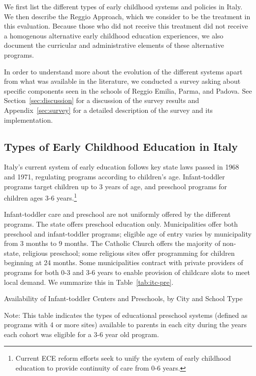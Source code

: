 We first list the different types of early childhood systems and policies in Italy. We then describe the Reggio Approach, which we consider to be the treatment in this evaluation. Because those who did not receive this treatment did not receive a homogenous alternative early childhood education experiences, we also document the curricular and administrative elements of these alternative programs. 

In order to understand more about the evolution of the different systems apart from what was available in the literature, we conducted a survey asking about specific components seen in the schools of Reggio Emilia, Parma, and Padova. See Section~\ref{sec:discussion} for a discussion of the survey results and Appendix~\ref{sec:survey} for a detailed description of the survey and its implementation.

\subsection{Types of Early Childhood Education in Italy}

Italy's current system of early education follows key state laws passed in 1968 and 1971, regulating programs according to children's age. Infant-toddler programs target children up to 3 years of age, and preschool programs for children ages 3-6 years.\footnote{Current ECE reform efforts seek to unify the system of early childhood education to provide continuity of care from 0-6 years.} 

Infant-toddler care and preschool are not uniformly offered by the different programs. The state offers preschool education only. Municipalities offer both preschool and infant-toddler programs; eligible age of entry varies by municipality from 3 months to 9 months. The Catholic Church offers the majority of non-state, religious preschool; some religious sites offer programming for children beginning at 24 months. Some municipalities contract with private providers of programs for both 0-3 and 3-6 years to enable provision of childcare slots to meet local demand. We summarize this in Table~\ref{tab:itc-pre}.

\begin{table}[H]
\centering
\caption{Availability of Infant-toddler Centers and Preschools, by City and School Type}\label{tab:itc-pre}
\begin{adjustbox}{width=\textwidth}
\begin{threeparttable}
	
\begin{tablenotes}
Note: This table indicates the types of educational preschool systems (defined as programs with 4 or more sites) available to parents in each city during the years each cohort was eligible for a 3-6 year old program. 
\end{tablenotes}
\end{threeparttable}
\end{adjustbox}
\end{table}

